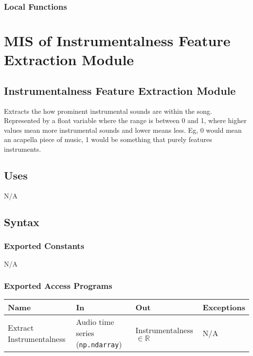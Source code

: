 \documentclass[12pt, titlepage]{article}
\begin{document}

\subsubsection{Local Functions}

 

\newpage

\section{MIS of Instrumentalness Feature Extraction Module} 

\subsection{Instrumentalness Feature Extraction Module}
Extracts the how prominent instrumental sounds are within the song. Represented by a float
variable where the range is between 0 and 1, where higher values mean more instrumental sounds
and lower means less. Eg, 0 would mean an acapella piece of music, 1 would be something that purely
features instruments.  

\subsection{Uses}
N/A

\subsection{Syntax}

\subsubsection{Exported Constants}
N/A

\subsubsection{Exported Access Programs}

\begin{center}
\begin{tabular}{p{2cm} p{4cm} p{4cm} p{2cm}}
\hline
\textbf{Name} & \textbf{In} & \textbf{Out} & \textbf{Exceptions}\\
\hline%
Extract Instrumentalness &Audio time series (\texttt{np.ndarray}) &Instrumentalness $\in \mathbb{R}$ &N/A\\
\hline
\end{tabular}
\end{center}
\end{document}
